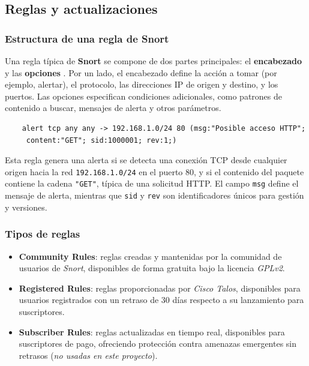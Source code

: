 \documentclass[12pt,a4paper]{report}
\begin{document}
\subsection{Reglas y actualizaciones}

\subsubsection{Estructura de una regla de Snort}

Una regla típica de \textbf{Snort} se compone de dos partes principales: el \textbf{encabezado} y las \textbf{opciones} \cite{snort3_rules_docs}. Por un lado, el encabezado define la acción a tomar (por ejemplo, alertar), el protocolo, las direcciones IP de origen y destino, y los puertos. Las opciones especifican condiciones adicionales, como patrones de contenido a buscar, mensajes de alerta y otros parámetros.

\begin{verbatim}
	alert tcp any any -> 192.168.1.0/24 80 (msg:"Posible acceso HTTP";
	 content:"GET"; sid:1000001; rev:1;)
\end{verbatim}

Esta regla genera una alerta si se detecta una conexión TCP desde cualquier origen hacia la red \texttt{192.168.1.0/24} en el puerto 80, y si el contenido del paquete contiene la cadena \texttt{"GET"}, típica de una solicitud HTTP. El campo \texttt{msg} define el mensaje de alerta, mientras que \texttt{sid} y \texttt{rev} son identificadores únicos para gestión y versiones.


\subsubsection{Tipos de reglas}

\begin{itemize}
	\item \textbf{Community Rules}: reglas creadas y mantenidas por la comunidad de usuarios de \textit{Snort}, disponibles de forma gratuita bajo la licencia \textit{GPLv2}.
	
	\item \textbf{Registered Rules}: reglas proporcionadas por \textit{Cisco Talos}, disponibles para usuarios registrados con un retraso de 30 días respecto a su lanzamiento para suscriptores.
	
	\item \textbf{Subscriber Rules}: reglas actualizadas en tiempo real, disponibles para suscriptores de pago, ofreciendo protección contra amenazas emergentes sin retrasos \cite{snort_talos} (\textit{no usadas en este proyecto}).
\end{itemize}
\end{document}
